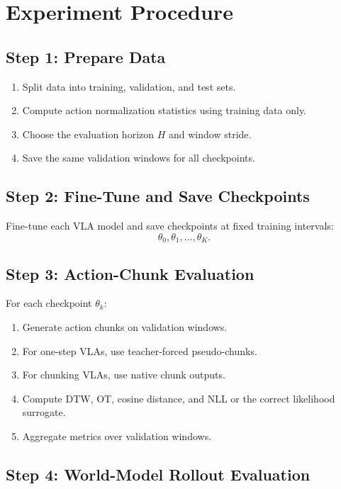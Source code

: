 \documentclass[11pt]{article}
\begin{document}
\section{Experiment Procedure}

\subsection*{Step 1: Prepare Data}

\begin{enumerate}
    \item Split data into training, validation, and test sets.
    \item Compute action normalization statistics using training data only.
    \item Choose the evaluation horizon $H$ and window stride.
    \item Save the same validation windows for all checkpoints.
\end{enumerate}

\subsection*{Step 2: Fine-Tune and Save Checkpoints}

Fine-tune each VLA model and save checkpoints at fixed training intervals:
\begin{equation}
\theta_0,\theta_1,\ldots,\theta_K.
\end{equation}

\subsection*{Step 3: Action-Chunk Evaluation}

For each checkpoint $\theta_k$:
\begin{enumerate}
    \item Generate action chunks on validation windows.
    \item For one-step VLAs, use teacher-forced pseudo-chunks.
    \item For chunking VLAs, use native chunk outputs.
    \item Compute DTW, OT, cosine distance, and NLL or the correct likelihood surrogate.
    \item Aggregate metrics over validation windows.
\end{enumerate}

\subsection*{Step 4: World-Model Rollout Evaluation}
\end{document}
